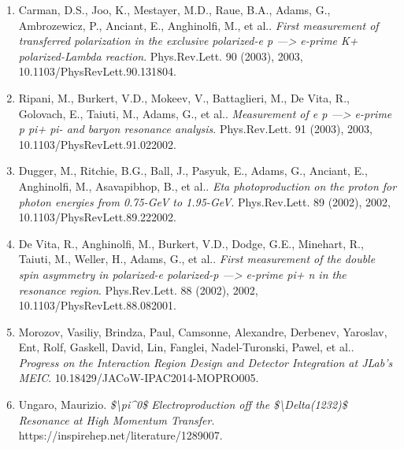 \begin{enumerate}
\item Carman, D.S., Joo, K., Mestayer, M.D., Raue, B.A., Adams, G., Ambrozewicz, P., Anciant, E., Anghinolfi, M., et al.. \textit{First measurement of transferred polarization in the exclusive polarized-e p ---> e-prime K+ polarized-Lambda reaction}. Phys.Rev.Lett. 90 (2003), 2003, 10.1103/PhysRevLett.90.131804.
\item Ripani, M., Burkert, V.D., Mokeev, V., Battaglieri, M., De Vita, R., Golovach, E., Taiuti, M., Adams, G., et al.. \textit{Measurement of e p ---> e-prime p pi+ pi- and baryon resonance analysis}. Phys.Rev.Lett. 91 (2003), 2003, 10.1103/PhysRevLett.91.022002.
\item Dugger, M., Ritchie, B.G., Ball, J., Pasyuk, E., Adams, G., Anciant, E., Anghinolfi, M., Asavapibhop, B., et al.. \textit{Eta photoproduction on the proton for photon energies from 0.75-GeV to 1.95-GeV}. Phys.Rev.Lett. 89 (2002), 2002, 10.1103/PhysRevLett.89.222002.
\item De Vita, R., Anghinolfi, M., Burkert, V.D., Dodge, G.E., Minehart, R., Taiuti, M., Weller, H., Adams, G., et al.. \textit{First measurement of the double spin asymmetry in polarized-e polarized-p ---> e-prime pi+ n in the resonance region}. Phys.Rev.Lett. 88 (2002), 2002, 10.1103/PhysRevLett.88.082001.
\item Morozov, Vasiliy, Brindza, Paul, Camsonne, Alexandre, Derbenev, Yaroslav, Ent, Rolf, Gaskell, David, Lin, Fanglei, Nadel-Turonski, Pawel, et al.. \textit{Progress on the Interaction Region Design and Detector Integration at JLab’s MEIC}. 10.18429/JACoW-IPAC2014-MOPRO005.
\item Ungaro, Maurizio. \textit{\$\textbackslash{}pi\textasciicircum{}0\$ Electroproduction off the \$\textbackslash{}Delta(1232)\$ Resonance at High Momentum Transfer}. https://inspirehep.net/literature/1289007.
\end{enumerate}
